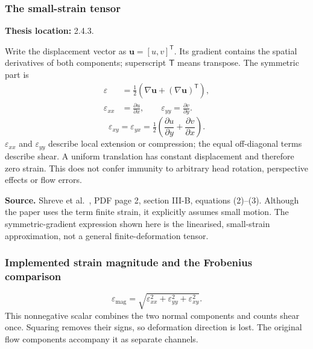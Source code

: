 \documentclass[11pt,a4paper]{article}
\numberwithin{equation}{section}
\begin{document}
\subsubsection{The small-strain tensor}
\label{fg:strain}
\textbf{Thesis location:} 2.4.3.

Write the displacement vector as $\mathbf{u}=[u,v]^{\mathsf T}$. Its gradient
contains the spatial derivatives of both components; superscript $\mathsf T$
means transpose. The symmetric part is
\begin{equation}
\begin{aligned}
    \varepsilon&=\tfrac12\left(\nabla\mathbf{u}
                         +(\nabla\mathbf{u})^{\mathsf T}\right),\\
    \varepsilon_{xx}&=\frac{\partial u}{\partial x},\qquad
    \varepsilon_{yy}=\frac{\partial v}{\partial y}.
\end{aligned}
    \label{fg:eq:strain-normal}
\end{equation}
\begin{equation}
    \varepsilon_{xy}=\varepsilon_{yx}
       =\tfrac12\left(\frac{\partial u}{\partial y}
                    +\frac{\partial v}{\partial x}\right).
    \label{fg:eq:strain-shear}
\end{equation}
$\varepsilon_{xx}$ and $\varepsilon_{yy}$ describe local extension or
compression; the equal off-diagonal terms describe shear. A uniform translation
has constant displacement and therefore zero strain. This does not confer
immunity to arbitrary head rotation, perspective effects or flow errors.

\textbf{Source.} Shreve et al.~\cite{shreve2011}, PDF page 2,
section III-B, equations (2)--(3). Although the paper uses the term finite
strain, it explicitly assumes small motion. The symmetric-gradient expression
shown here is the linearised, small-strain approximation, not a general
finite-deformation tensor.

\subsubsection{Implemented strain magnitude and the Frobenius comparison}
\label{fg:magnitude}
\begin{equation}
    \varepsilon_{\mathrm{mag}}
       =\sqrt{\varepsilon_{xx}^2+\varepsilon_{yy}^2
                    +\varepsilon_{xy}^2}.
    \label{fg:eq:strain-magnitude}
\end{equation}
This nonnegative scalar combines the two normal components and counts shear
once. Squaring removes their signs, so deformation direction is lost. The
original flow components accompany it as separate channels.
\end{document}
